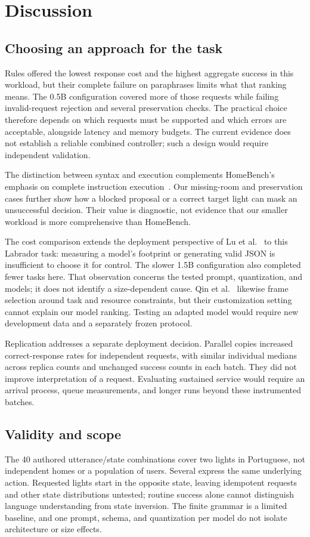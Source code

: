 \documentclass[letterpaper,conference]{IEEEtran}
\begin{document}
\section{Discussion}
\subsection{Choosing an approach for the task}
Rules offered the lowest response cost and the highest aggregate success in this workload, but their complete failure on paraphrases limits what that ranking means. The 0.5B configuration covered more of those requests while failing invalid-request rejection and several preservation checks. The practical choice therefore depends on which requests must be supported and which errors are acceptable, alongside latency and memory budgets. The current evidence does not establish a reliable combined controller; such a design would require independent validation.

The distinction between syntax and execution complements HomeBench's emphasis on complete instruction execution~\cite{homebench}. Our missing-room and preservation cases further show how a blocked proposal or a correct target light can mask an unsuccessful decision. Their value is diagnostic, not evidence that our smaller workload is more comprehensive than HomeBench.

The cost comparison extends the deployment perspective of Lu et al.~\cite{edge} to this Labrador task: measuring a model's footprint or generating valid JSON is insufficient to choose it for control. The slower 1.5B configuration also completed fewer tasks here. That observation concerns the tested prompt, quantization, and models; it does not identify a size-dependent cause. Qin et al.~\cite{empirical} likewise frame selection around task and resource constraints, but their customization setting cannot explain our model ranking. Testing an adapted model would require new development data and a separately frozen protocol.

Replication addresses a separate deployment decision. Parallel copies increased correct-response rates for independent requests, with similar individual medians across replica counts and unchanged success counts in each batch. They did not improve interpretation of a request. Evaluating sustained service would require an arrival process, queue measurements, and longer runs beyond these instrumented batches.

\subsection{Validity and scope}
The 40 authored utterance/state combinations cover two lights in Portuguese, not independent homes or a population of users. Several express the same underlying action. Requested lights start in the opposite state, leaving idempotent requests and other state distributions untested; routine success alone cannot distinguish language understanding from state inversion. The finite grammar is a limited baseline, and one prompt, schema, and quantization per model do not isolate architecture or size effects.
\end{document}
